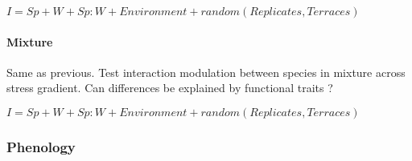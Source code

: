 \documentclass[12pt]{article} %
\begin{document}
$I= Sp + W + Sp:W + Environment + random(Replicates,Terraces)$

\paragraph{Mixture}
Same as previous. Test interaction modulation between species in mixture across stress gradient. Can differences be explained by functional traits ?

$I= Sp + W + Sp:W + Environment + random(Replicates,Terraces)$


\subsubsection{Phenology}




\begin{spacing}{1.0}

\end{spacing}
\end{document}
